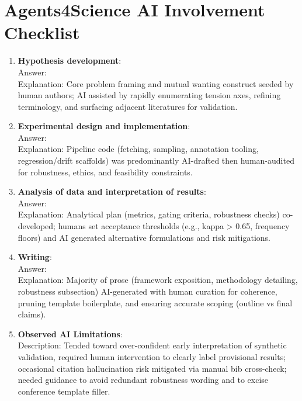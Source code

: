 \documentclass{article}
\begin{document}
\section*{Agents4Science AI Involvement Checklist}
\begin{enumerate}
  \item \textbf{Hypothesis development}: \\Answer: \involvementB{} \\Explanation: Core problem framing and mutual wanting construct seeded by human authors; AI assisted by rapidly enumerating tension axes, refining terminology, and surfacing adjacent literatures for validation.
  \item \textbf{Experimental design and implementation}: \\Answer: \involvementC{} \\Explanation: Pipeline code (fetching, sampling, annotation tooling, regression/drift scaffolds) was predominantly AI-drafted then human-audited for robustness, ethics, and feasibility constraints.
  \item \textbf{Analysis of data and interpretation of results}: \\Answer: \involvementB{} \\Explanation: Analytical plan (metrics, gating criteria, robustness checks) co-developed; humans set acceptance thresholds (e.g., kappa > 0.65, frequency floors) and AI generated alternative formulations and risk mitigations.
  \item \textbf{Writing}: \\Answer: \involvementC{} \\Explanation: Majority of prose (framework exposition, methodology detailing, robustness subsection) AI-generated with human curation for coherence, pruning template boilerplate, and ensuring accurate scoping (outline vs final claims).
  \item \textbf{Observed AI Limitations}: \\Description: Tended toward over-confident early interpretation of synthetic validation, required human intervention to clearly label provisional results; occasional citation hallucination risk mitigated via manual bib cross-check; needed guidance to avoid redundant robustness wording and to excise conference template filler.
\end{enumerate}

\newpage
\end{document}
